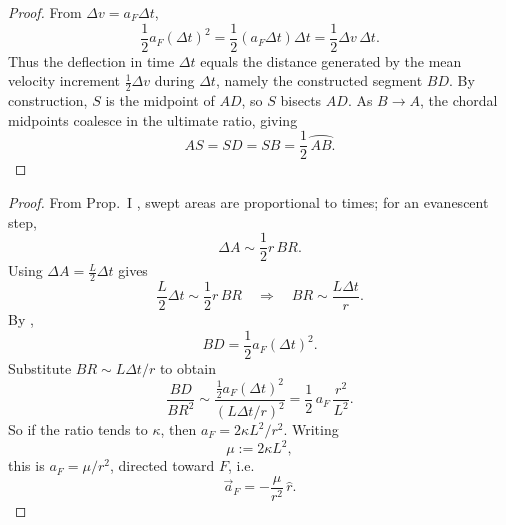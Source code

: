 \begin{proof}
From $\Delta v=a_F\Delta t$,
\[
  \frac12 a_F(\Delta t)^2
  =\frac12 (a_F\Delta t)\Delta t
  =\frac12 \Delta v\,\Delta t.
\]
Thus the deflection in time $\Delta t$ equals the distance generated by the mean velocity increment $\tfrac12\Delta v$ during $\Delta t$, namely the constructed segment $BD$. By construction, $S$ is the midpoint of $AD$, so $S$ bisects $AD$. As $B\to A$, the chordal midpoints coalesce in the ultimate ratio, giving
\[
  AS=SD=SB=\frac12\,\wideparen{AB}.
\]
\end{proof}


\begin{proof}
From Prop.~I \cite{newton1846mottewikisource}, swept areas are proportional to times; for an evanescent step,
\[
  \Delta A\sim \frac12 r\,BR.
\]
Using $\Delta A=\frac{L}{2}\Delta t$ gives
\[
  \frac{L}{2}\Delta t\sim \frac12 r\,BR
  \quad\Longrightarrow\quad
  BR\sim \frac{L\Delta t}{r}.
\]
By ,
\[
  BD=\frac12 a_F(\Delta t)^2.
\]
Substitute $BR\sim L\Delta t/r$ to obtain
\[
  \frac{BD}{BR^2}
  \sim
  \frac{\frac12 a_F(\Delta t)^2}{(L\Delta t/r)^2}
  =
  \frac12\,a_F\,\frac{r^2}{L^2}.
\]
So if the ratio tends to $\kappa$, then $a_F=2\kappa L^2/r^2$. Writing
\[
  \mu:=2\kappa L^2,
\]
this is $a_F=\mu/r^2$, directed toward $F$, i.e.
\[
  \vec{a}_F=-\frac{\mu}{r^2}\,\hat{r}.
\]
\end{proof}
